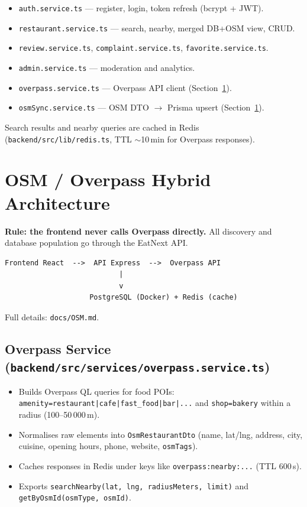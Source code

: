 \documentclass[11pt,a4paper]{article}
\begin{document}
\begin{itemize}
  \item \texttt{auth.service.ts} --- register, login, token refresh (bcrypt + JWT).
  \item \texttt{restaurant.service.ts} --- search, nearby, merged DB+OSM view, CRUD.
  \item \texttt{review.service.ts}, \texttt{complaint.service.ts}, \texttt{favorite.service.ts}.
  \item \texttt{admin.service.ts} --- moderation and analytics.
  \item \texttt{overpass.service.ts} --- Overpass API client (Section~\ref{sec:osm}).
  \item \texttt{osmSync.service.ts} --- OSM DTO $\rightarrow$ Prisma upsert (Section~\ref{sec:osm}).
\end{itemize}

Search results and nearby queries are cached in Redis
(\texttt{backend/src/lib/redis.ts}, TTL $\sim$10\,min for Overpass responses).

\section{OSM / Overpass Hybrid Architecture}
\label{sec:osm}

\textbf{Rule: the frontend never calls Overpass directly.}
All discovery and database population go through the EatNext API.

\begin{verbatim}
Frontend React  -->  API Express  -->  Overpass API
                           |
                           v
                    PostgreSQL (Docker) + Redis (cache)
\end{verbatim}

Full details: \texttt{docs/OSM.md}.

\subsection{Overpass Service (\texttt{backend/src/services/overpass.service.ts})}

\begin{itemize}
  \item Builds Overpass QL queries for food POIs: \texttt{amenity=restaurant|cafe|fast\_food|bar|...}
        and \texttt{shop=bakery} within a radius (100--50\,000\,m).
  \item Normalises raw elements into \texttt{OsmRestaurantDto} (name, lat/lng, address, city,
        cuisine, opening hours, phone, website, \texttt{osmTags}).
  \item Caches responses in Redis under keys like \texttt{overpass:nearby:...} (TTL 600\,s).
  \item Exports \texttt{searchNearby(lat, lng, radiusMeters, limit)} and
        \texttt{getByOsmId(osmType, osmId)}.
\end{itemize}
\end{document}
